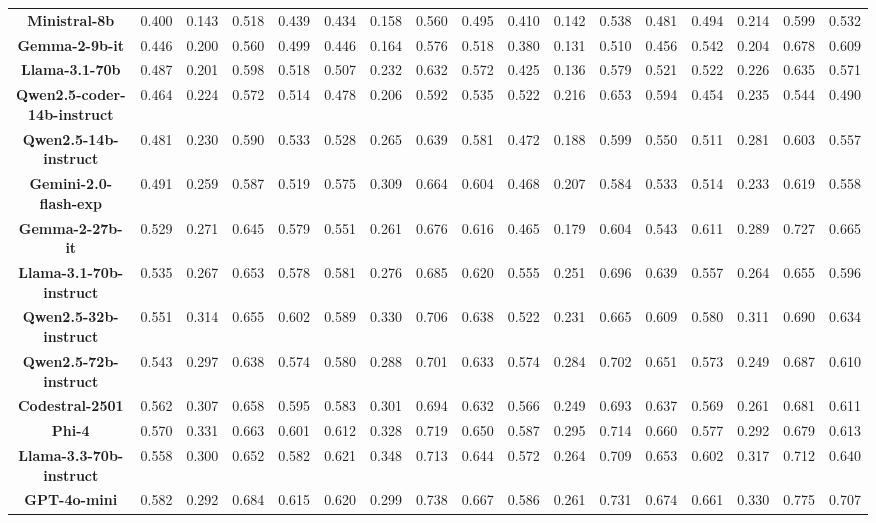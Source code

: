 \begin{table*}[t]
{\begin{tabular}{ccccccccccccccccc}
\textbf{Ministral-8b} & 0.400 & 0.143 & 0.518 & 0.439 & 0.434 & 0.158 & 0.560 & 0.495 & 0.410 & 0.142 & 0.538 & 0.481 & 0.494 & 0.214 & 0.599 & 0.532 \\
\textbf{Gemma-2-9b-it} & 0.446 & 0.200 & 0.560 & 0.499 & 0.446 & 0.164 & 0.576 & 0.518 & 0.380 & 0.131 & 0.510 & 0.456 & 0.542 & 0.204 & 0.678 & 0.609 \\
\textbf{Llama-3.1-70b} & 0.487 & 0.201 & 0.598 & 0.518 & 0.507 & 0.232 & 0.632 & 0.572 & 0.425 & 0.136 & 0.579 & 0.521 & 0.522 & 0.226 & 0.635 & 0.571 \\
\textbf{Qwen2.5-coder-14b-instruct} & 0.464 & 0.224 & 0.572 & 0.514 & 0.478 & 0.206 & 0.592 & 0.535 & 0.522 & 0.216 & 0.653 & 0.594 & 0.454 & 0.235 & 0.544 & 0.490 \\
\textbf{Qwen2.5-14b-instruct} & 0.481 & 0.230 & 0.590 & 0.533 & 0.528 & 0.265 & 0.639 & 0.581 & 0.472 & 0.188 & 0.599 & 0.550 & 0.511 & 0.281 & 0.603 & 0.557 \\
\textbf{Gemini-2.0-flash-exp} & 0.491 & 0.259 & 0.587 & 0.519 & 0.575 & 0.309 & 0.664 & 0.604 & 0.468 & 0.207 & 0.584 & 0.533 & 0.514 & 0.233 & 0.619 & 0.558 \\
\textbf{Gemma-2-27b-it} & 0.529 & 0.271 & 0.645 & 0.579 & 0.551 & 0.261 & 0.676 & 0.616 & 0.465 & 0.179 & 0.604 & 0.543 & 0.611 & 0.289 & 0.727 & 0.665 \\
\textbf{Llama-3.1-70b-instruct} & 0.535 & 0.267 & 0.653 & 0.578 & 0.581 & 0.276 & 0.685 & 0.620 & 0.555 & 0.251 & 0.696 & 0.639 & 0.557 & 0.264 & 0.655 & 0.596 \\
\textbf{Qwen2.5-32b-instruct} & 0.551 & 0.314 & 0.655 & 0.602 & 0.589 & 0.330 & 0.706 & 0.638 & 0.522 & 0.231 & 0.665 & 0.609 & 0.580 & 0.311 & 0.690 & 0.634 \\
\textbf{Qwen2.5-72b-instruct} & 0.543 & 0.297 & 0.638 & 0.574 & 0.580 & 0.288 & 0.701 & 0.633 & 0.574 & 0.284 & 0.702 & 0.651 & 0.573 & 0.249 & 0.687 & 0.610 \\
\textbf{Codestral-2501} & 0.562 & 0.307 & 0.658 & 0.595 & 0.583 & 0.301 & 0.694 & 0.632 & 0.566 & 0.249 & 0.693 & 0.637 & 0.569 & 0.261 & 0.681 & 0.611 \\
\textbf{Phi-4} & 0.570 & 0.331 & 0.663 & 0.601 & 0.612 & 0.328 & 0.719 & 0.650 & 0.587 & 0.295 & 0.714 & 0.660 & 0.577 & 0.292 & 0.679 & 0.613 \\
\textbf{Llama-3.3-70b-instruct} & 0.558 & 0.300 & 0.652 & 0.582 & 0.621 & 0.348 & 0.713 & 0.644 & 0.572 & 0.264 & 0.709 & 0.653 & 0.602 & 0.317 & 0.712 & 0.640 \\
\textbf{GPT-4o-mini} & 0.582 & 0.292 & 0.684 & 0.615 & 0.620 & 0.299 & 0.738 & 0.667 & 0.586 & 0.261 & 0.731 & 0.674 & 0.661 & 0.330 & 0.775 & 0.707 \\

\end{tabular}}
\end{table*}
